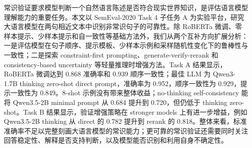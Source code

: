 常识验证要求模型判断一个自然语言陈述是否符合现实世界知识，是评估语言模型理解能力的重要任务。本文以 SemEval-2020 Task 4 \comve 子任务 A 为实验平台，研究大语言模型在两句相近文本中识别非常识句子的可靠性。除 RoBERTa 微调、零样本提示、少样本提示和自一致性等基础方法外，我们从两个互补方向扩展分析：一是评估模型在句子顺序、提示模板、少样本示例和采样随机性变化下的鲁棒性与一致性；二是探索 constraint-first prompting、generate-verify-rerank 和 consistency-based uncertainty 等轻量推理时增强方法。Task A 结果显示，RoBERTa 微调达到 0.868 准确率和 0.939 顺序一致性；最佳 LLM 为 Qwen3-1.7B thinking zero-shot direct prompt，准确率为 0.952，顺序一致性为 0.929，提示一致性为 0.849。8-shot 示例没有带来整体收益；no-thinking self-consistency 能将 Qwen3.5-2B minimal prompt 从 0.684 提升到 0.720，但仍低于 thinking zero-shot。Task B 结果显示，验证增强策略在 stronger models 上有进一步增益，例如 Qwen3.5-2B thinking 从 direct 的 0.782 提升到 rerank 的 0.818。整体来看，标准准确率不足以完整刻画大语言模型的常识能力；更可靠的常识验证还需要同时关注回答稳定性、解释是否支持判断，以及模型能否识别和利用自身不确定性。
